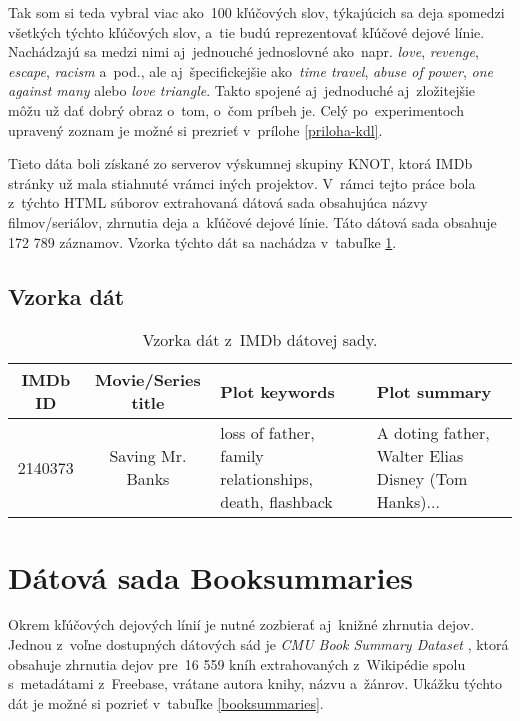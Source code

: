 Tak som si teda vybral viac ako~100 kľúčových slov, týkajúcich sa deja spomedzi všetkých týchto kľúčových slov, a~tie budú reprezentovať kľúčové dejové línie. Nachádzajú sa medzi nimi aj~jednouché jednoslovné ako~napr. \textit{love}, \textit{revenge}, \textit{escape}, \textit{racism} a~pod., ale aj~špecifickejšie ako~\textit{time travel}, \textit{abuse of power}, \textit{one against many} alebo \textit{love triangle}. Takto spojené aj~jednoduché aj~zložitejšie môžu už dať dobrý obraz o~tom, o~čom príbeh je. Celý po~experimentoch upravený zoznam je možné si prezrieť v~prílohe \ref{priloha-kdl}. 

Tieto dáta boli získané zo serverov výskumnej skupiny KNOT, ktorá IMDb stránky už mala stiahnuté vrámci iných projektov. V~rámci tejto práce bola z~týchto HTML súborov extrahovaná dátová sada obsahujúca názvy filmov/seriálov, zhrnutia deja a~kľúčové dejové línie. Táto dátová sada obsahuje 172 789 záznamov. Vzorka týchto dát sa nachádza v~tabuľke \ref{imdb}.

\subsection*{Vzorka dát}

\begin{table}[hbt]
\centering
\caption{Vzorka dát z~IMDb dátovej sady.}
\label{imdb}
\begin{tabular}{|c|c|
>{\centering\arraybackslash}m{7em}|
>{\centering\arraybackslash}m{7em}|}
\hline
IMDb ID & Movie/Series title & Plot keywords & Plot summary \\
\hline
2140373 & Saving Mr. Banks & loss of father, family relationships, death, flashback &  A doting father, Walter Elias Disney (Tom Hanks)...\\ 
\hline

\end{tabular}
\end{table}

\section{Dátová sada Booksummaries}
Okrem kľúčových dejových línií je nutné zozbierať aj~knižné zhrnutia dejov. Jednou z~voľne dostupných dátových sád je \textit{CMU Book Summary Dataset} \cite{Bamman:2013}, ktorá obsahuje zhrnutia dejov pre~16 559 kníh extrahovaných z~Wikipédie spolu s~metadátami z~Freebase, vrátane autora knihy, názvu a~žánrov. Ukážku týchto dát je možné si pozrieť v~tabuľke \ref{booksummaries}.

